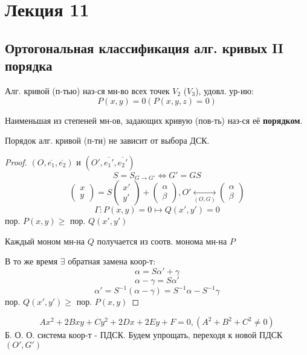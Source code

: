 \section{Лекция 11}
\subsection{Ортогональная классификация алг. кривых II порядка}
\begin{definition}
Алг. кривой (п-тью) наз-ся мн-во всех точек $V_2$ ($V_3$), удовл. ур-ию:
\[
P(x, y) = 0 (P(x, y, z) = 0)
\]
\end{definition}
\begin{definition}
Наименьшая из степеней мн-ов, задающих кривую (пов-ть) наз-ся её \textbf{порядком}.
\end{definition}
\begin{statement}
Порядок алг. кривой (п-ти) не зависит от выбора ДСК.
\end{statement}
\begin{proof}
$(O, \overline{e_1}, \overline{e_2})$ и $(O', \overline{e_1'}, \overline{e_2'})$
\[
S = S_{G\to G'} \iff G' = GS
\]
\[
\begin{pmatrix}x \\ y \end{pmatrix} = S\begin{pmatrix}x' \\ y' \end{pmatrix} + \begin{pmatrix} \alpha \\ \beta \end{pmatrix}, O' \underset{(O, G)}{\longleftrightarrow}\begin{pmatrix}\alpha \\ \beta \end{pmatrix}
\]
\[
\Gamma \colon P(x, y) = 0 \mapsto Q(x', y') = 0
\]
пор. $P(x, y) \geq $ пор. $Q(x', y')$
\begin{note}
Каждый моном мн-на $Q$ получается из соотв. монома мн-на $P$
\end{note}
В то же время $\exists$ обратная замена коор-т:
\[
\alpha = S\alpha' + \gamma
\]
\[
\alpha - \gamma = S\alpha'
\]
\[
 \alpha' = S^{-1}(\alpha - \gamma) = S^{-1}\alpha - S^{-1}\gamma
\]
пор. $Q(x', y') \geq $ пор. $P(x, y)$
\end{proof}
\begin{equation}
Ax^{2} + 2Bxy + Cy^{2} + 2Dx + 2Ey + F = 0, (A^{2} + B^{2} + C^{2} \neq 0)
\end{equation}
Б. О. О. система коор-т - ПДСК. Будем упрощать, переходя к новой ПДСК $(O', G')$
